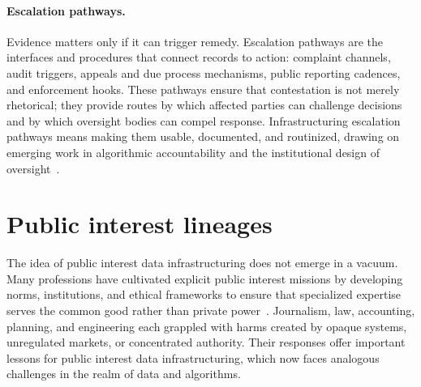 \documentclass[acmsmall,screen]{acmart}
\begin{document}
\paragraph{Escalation pathways.}
Evidence matters only if it can trigger remedy. Escalation pathways are the interfaces and procedures that connect records to action: complaint channels, audit triggers, appeals and due process mechanisms, public reporting cadences, and enforcement hooks. These pathways ensure that contestation is not merely rhetorical; they provide routes by which affected parties can challenge decisions and by which oversight bodies can compel response. Infrastructuring escalation pathways means making them usable, documented, and routinized, drawing on emerging work in algorithmic accountability and the institutional design of oversight~\cite{hutchinsonAccountabilityMachineLearning2021,pasquale_black_2016}.

\section*{Public interest lineages}
The idea of public interest data infrastructuring does not emerge in a vacuum. Many professions have cultivated explicit public interest missions by developing norms, institutions, and ethical frameworks to ensure that specialized expertise serves the common good rather than private power~\cite{stapletonWhoHasInterest2022,dantecInfrastructuringFormationPublics2013,costanza-chockDesignJustice2020}. Journalism, law, accounting, planning, and engineering each grappled with harms created by opaque systems, unregulated markets, or concentrated authority. Their responses offer important lessons for public interest data infrastructuring, which now faces analogous challenges in the realm of data and algorithms.
\end{document}
